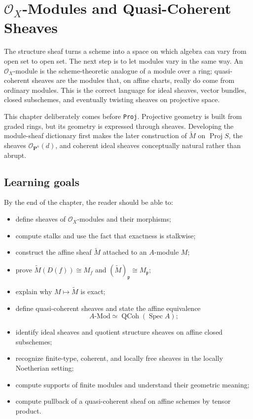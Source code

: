 \chapter{\texorpdfstring{$\mathcal O_X$-Modules and Quasi-Coherent Sheaves}{O-X Modules and Quasi-Coherent Sheaves}}
\label{ch:vi33-ox-modules-qcoh}

The structure sheaf turns a scheme into a space on which algebra can vary from open set to open set.  The next step is to let modules vary in the same way.  An $\mathcal O_X$-module is the scheme-theoretic analogue of a module over a ring; quasi-coherent sheaves are the modules that, on affine charts, really do come from ordinary modules.  This is the correct language for ideal sheaves, vector bundles, closed subschemes, and eventually twisting sheaves on projective space.

This chapter deliberately comes before \texttt{Proj}.  Projective geometry is built from graded rings, but its geometry is expressed through sheaves.  Developing the module-sheaf dictionary first makes the later construction of $\widetilde M$ on $\operatorname{Proj} S$, the sheaves $\mathcal O_{\mathbf P^n}(d)$, and coherent ideal sheaves conceptually natural rather than abrupt.

\section*{Learning goals}
By the end of the chapter, the reader should be able to:
\begin{itemize}
\item define sheaves of $\mathcal O_X$-modules and their morphisms;
\item compute stalks and use the fact that exactness is stalkwise;
\item construct the affine sheaf $\widetilde M$ attached to an $A$-module $M$;
\item prove $\widetilde M(D(f))\cong M_f$ and $(\widetilde M)_{\mathfrak p}\cong M_{\mathfrak p}$;
\item explain why $M\mapsto\widetilde M$ is exact;
\item define quasi-coherent sheaves and state the affine equivalence
\[
A\text{-}\mathrm{Mod}\simeq\operatorname{QCoh}(\operatorname{Spec}A);
\]
\item identify ideal sheaves and quotient structure sheaves on affine closed subschemes;
\item recognize finite-type, coherent, and locally free sheaves in the locally Noetherian setting;
\item compute supports of finite modules and understand their geometric meaning;
\item compute pullback of a quasi-coherent sheaf on affine schemes by tensor product.
\end{itemize}

